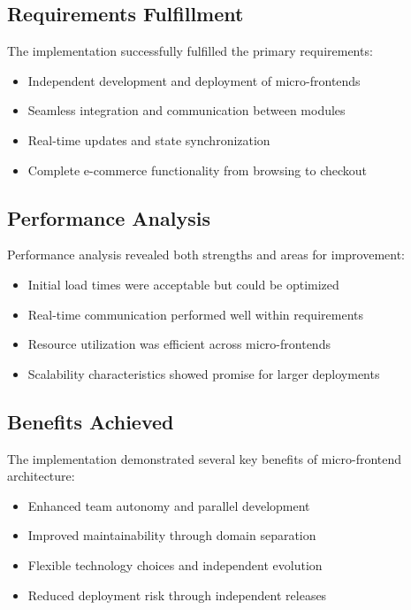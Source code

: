 \documentclass[12pt,a4paper]{report}
\begin{document}
\subsection{Requirements Fulfillment}

The implementation successfully fulfilled the primary requirements:
\begin{itemize}
    \item Independent development and deployment of micro-frontends
    \item Seamless integration and communication between modules
    \item Real-time updates and state synchronization
    \item Complete e-commerce functionality from browsing to checkout
\end{itemize}

\subsection{Performance Analysis}

Performance analysis revealed both strengths and areas for improvement:
\begin{itemize}
    \item Initial load times were acceptable but could be optimized
    \item Real-time communication performed well within requirements
    \item Resource utilization was efficient across micro-frontends
    \item Scalability characteristics showed promise for larger deployments
\end{itemize}

\subsection{Benefits Achieved}

The implementation demonstrated several key benefits of micro-frontend architecture:
\begin{itemize}
    \item Enhanced team autonomy and parallel development
    \item Improved maintainability through domain separation
    \item Flexible technology choices and independent evolution
    \item Reduced deployment risk through independent releases
\end{itemize}
\end{document}

